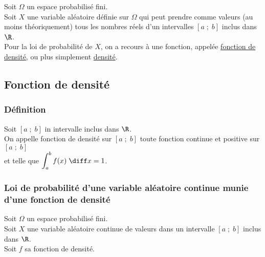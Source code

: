 Soit $\Omega$ un espace probabilisé fini. \\
Soit $X$ une variable aléatoire définie sur $\Omega$ qui peut prendre comme valeurs (au moins théoriquement) tous les nombres réels d'un intervalles $\left[a \; ; \; b\right]$ inclus dans $\R$. \\

Pour la loi de probabilité de $X$, on a recours à une fonction, appelée \underline{fonction de densité}, ou plus simplement \underline{densité}.

\subsection{Fonction de densité}

\subsubsection{Définition}

Soit $\left[a \; ; \; b\right]$ in intervalle inclus dans $\R$. \\

On appelle fonction de densité sur $\left[a \; ; \; b\right]$ toute fonction continue et positive sur $\left[a \; ; \; b\right]$ \\ et telle que $\displaystyle{ \int_a^b f(x) \; \diff x} = 1$.

\newpage

\subsubsection{Loi de probabilité d'une variable aléatoire continue munie d'une fonction de densité}

Soit $\Omega$ un espace probabilisé fini. \\
Soit $X$ une variable aléatoire continue de valeurs dans un intervalle $\left[a \; ; \; b\right]$ inclus dans $\R$. \\
Soit $f$ sa fonction de densité. \\

